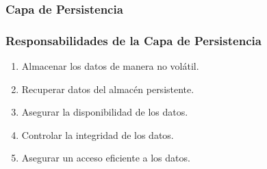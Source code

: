 \documentclass[a4paper,slidestop,xcolor=pst,blue]{beamer}
\begin{document}
\begin{frame}
    \frametitle{Capa de Persistencia}
\end{frame}

\begin{frame}[c]
	\frametitle{Responsabilidades de la Capa de Persistencia}
	\begin{enumerate}[<+->]
        \item Almacenar los datos de manera no volátil.
        \item Recuperar datos del almacén persistente.
        \item Asegurar la disponibilidad de los datos.
        \item Controlar la integridad de los datos.
        \item Asegurar un acceso eficiente a los datos.
	\end{enumerate}
\end{frame}
\end{document}
